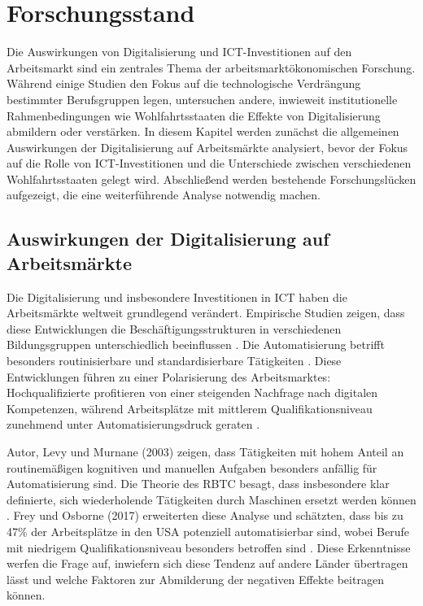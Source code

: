 
\section{Forschungsstand}

Die Auswirkungen von Digitalisierung und \ac{ICT}-Investitionen auf den Arbeitsmarkt sind
ein zentrales Thema der arbeitsmarktökonomischen Forschung. Während einige Studien den
Fokus auf die technologische Verdrängung bestimmter Berufsgruppen legen, untersuchen
andere, inwieweit institutionelle Rahmenbedingungen wie Wohlfahrtsstaaten die Effekte von
Digitalisierung abmildern oder verstärken. In diesem Kapitel werden zunächst die
allgemeinen Auswirkungen der Digitalisierung auf Arbeitsmärkte analysiert, bevor der Fokus
auf die Rolle von \ac{ICT}-Investitionen und die Unterschiede zwischen verschiedenen
Wohlfahrtsstaaten gelegt wird. Abschließend werden bestehende Forschungslücken aufgezeigt,
die eine weiterführende Analyse notwendig machen.


\subsection{Auswirkungen der Digitalisierung auf Arbeitsmärkte}

Die Digitalisierung und insbesondere Investitionen in \ac{ICT} haben die Arbeitsmärkte
weltweit grundlegend verändert. Empirische Studien zeigen, dass diese Entwicklungen die
Beschäftigungsstrukturen in verschiedenen Bildungsgruppen unterschiedlich beeinflussen
\parencite[vgl.][S. 1589]{autor2013thegrowth}. Die Automatisierung betrifft besonders
routinisierbare und standardisierbare Tätigkeiten 
\parencite[vgl.][S. 20]{frey2013thefuture}. Diese Entwicklungen führen zu einer 
Polarisierung des Arbeitsmarktes: Hochqualifizierte profitieren von einer steigenden 
Nachfrage nach digitalen Kompetenzen, während Arbeitsplätze mit mittlerem 
Qualifikationsniveau zunehmend unter Automatisierungsdruck geraten
\parencite[vgl.][S. 2509–2510]{goos2014explaining}.

Autor, Levy und Murnane (2003) zeigen, dass Tätigkeiten mit hohem Anteil an routinemäßigen
kognitiven und manuellen Aufgaben besonders anfällig für Automatisierung sind. Die Theorie
des \ac{RBTC} besagt, dass insbesondere klar definierte, sich wiederholende Tätigkeiten 
durch Maschinen ersetzt werden können \parencite[vgl.][S. 1281]{autor2003theskill}. Frey 
und Osborne (2017) erweiterten diese Analyse und schätzten, dass bis zu 47\% der 
Arbeitsplätze in den USA potenziell automatisierbar sind, wobei Berufe mit niedrigem 
Qualifikationsniveau besonders betroffen sind \parencite[S. 36–38]{frey2013thefuture}. 
Diese Erkenntnisse  werfen die Frage auf, inwiefern sich diese Tendenz auf andere Länder 
übertragen lässt und welche Faktoren zur Abmilderung der negativen Effekte beitragen 
können.

